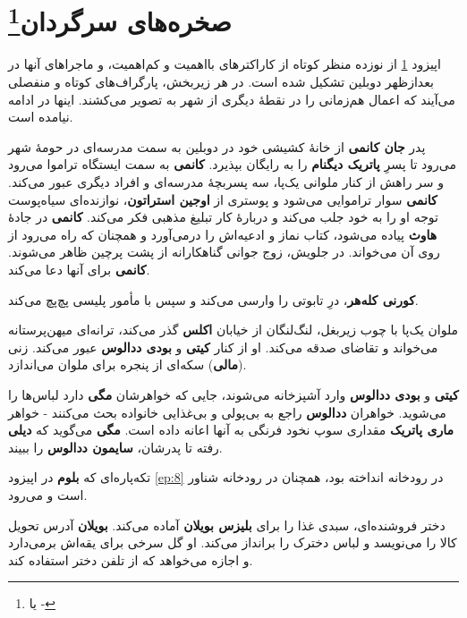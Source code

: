\documentclass[12pt]{book}
\newcommand{\noun}[1]{{\textbf{#1}}}
\begin{document}
    \chapter[صخره‌های سرگردان]{صخره‌های سرگردان\protect\footnote{ یا -}}\label{ep:10}
    اپیزود \ref{ep:10} از نوزده منظر کوتاه از کاراکترهای بااهمیت و کم‌اهمیت، و ماجراهای آنها در بعدازظهر دوبلین تشکیل شده است. در هر زیربخش، پارگراف‌های کوتاه و منفصلی می‌آیند که اعمال هم‌زمانی را در نقطهٔ دیگری از شهر به تصویر می‌کشند. اینها در ادامه نیامده است.

    پدر \noun{جان کانمی} از خانهٔ کشیشی خود در دوبلین به سمت مدرسه‌ای در حومهٔ شهر می‌رود تا پسرِ \noun{پاتریک دیگنام} را به رایگان بپذیرد. \noun{کانمی} به سمت ایستگاه تراموا می‌رود و سر راهش از کنار ملوانی یک‌پا، سه پسربچهٔ مدرسه‌ای و افراد دیگری عبور می‌کند. \noun{کانمی} سوار تراموایی می‌شود و پوستری از \noun{اوجین استراتون}، نوازنده‌ای سیاه‌پوست توجه او را به خود جلب می‌کند و دربارهٔ کار تبلیغ مذهبی فکر می‌کند. \noun{کانمی} در جادهٔ \noun{هاوث} پیاده می‌شود، کتاب نماز و ادعیه‌اش را درمی‌آورد و همچنان که راه می‌رود از روی آن می‌خواند. در جلویش، زوج جوانی گناهکارانه از پشت پرچین ظاهر می‌شوند. \noun{کانمی} برای آنها دعا می‌کند.

    \noun{کورنی کله‌هر}، درِ تابوتی را وارسی می‌کند و سپس با مأمور پلیسی پچ‌پچ می‌کند.

    ملوان یک‌پا با چوب زیربغل، لنگ‌لنگان از خیابان \noun{اکلس} گذر می‌کند، ترانه‌ای میهن‌پرستانه می‌خواند و تقاضای صدقه می‌کند. او از کنار \noun{کیتی} و \noun{بودی ددالوس} عبور می‌کند. زنی (\noun{مالی}) سکه‌ای از پنجره برای ملوان می‌اندازد.

    \noun{کیتی} و \noun{بودی ددالوس} وارد آشپزخانه می‌شوند، جایی که خواهرشان \noun{مگی} دارد لباس‌ها را می‌شوید. خواهران \noun{ددالوس} راجع به بی‌پولی و بی‌غذایی خانواده بحث می‌کنند - خواهر \noun{ماری پاتریک} مقداری سوپ نخود فرنگی به آنها اعانه داده است. \noun{مگی} می‌گوید که \noun{دیلی} رفته تا پدرشان، \noun{سایمون ددالوس‬} را ببیند.

    تکه‌پاره‌ای که \noun{بلوم} در اپیزود \ref{ep:8} در رودخانه انداخته بود، همچنان در رودخانه شناور است و می‌رود.

    دختر فروشنده‌ای، سبدی غذا را برای \noun{بلیزس بویلان‬} آماده می‌کند. \noun{بویلان} آدرس تحویل کالا را می‌نویسد و لباس دخترک را برانداز می‌کند. او گل سرخی برای یقه‌اش برمی‌دارد و اجازه می‌خواهد که از تلفن دختر استفاده کند.
\end{document}
